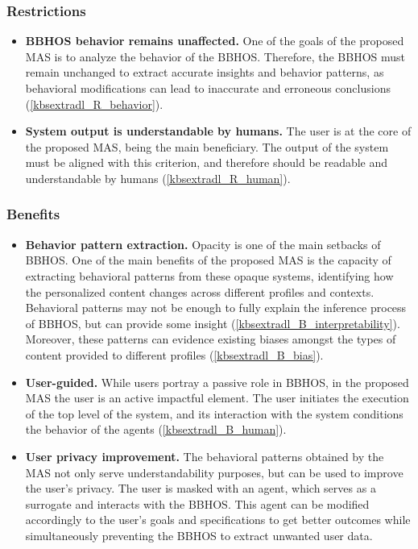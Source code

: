 \subsubsection*{Restrictions}
\begin{itemize}
    \item \textbf{BBHOS behavior remains unaffected.} One of the goals of the proposed MAS is to analyze the behavior of the BBHOS. Therefore, the BBHOS must remain unchanged to extract accurate insights and behavior patterns, as behavioral modifications can lead to inaccurate and erroneous conclusions (\ref{kbsextradl_R_behavior}).
    
    \item \textbf{System output is understandable by humans.} The user is at the core of the proposed MAS, being the main beneficiary. The output of the system must be aligned with this criterion, and therefore should be readable and understandable by humans (\ref{kbsextradl_R_human}).
\end{itemize}

\subsubsection*{Benefits}
\begin{itemize}
    \item \textbf{Behavior pattern extraction.} Opacity is one of the main setbacks of BBHOS. One of the main benefits of the proposed MAS is the capacity of extracting behavioral patterns from these opaque systems, identifying how the personalized content changes across different profiles and contexts. Behavioral patterns may not be enough to fully explain the inference process of BBHOS, but can provide some insight (\ref{kbsextradl_B_interpretability}). Moreover, these patterns can evidence existing biases amongst the types of content provided to different profiles (\ref{kbsextradl_B_bias}).
    
    \item \textbf{User-guided.} While users portray a passive role in BBHOS, in the proposed MAS the user is an active impactful element. The user initiates the execution of the top level of the system, and its interaction with the system conditions the behavior of the agents (\ref{kbsextradl_B_human}). 
    
    \item \textbf{User privacy improvement.} The behavioral patterns obtained by the MAS not only serve understandability purposes, but can be used to improve the user's privacy. The user is masked with an agent, which serves as a surrogate and interacts with the BBHOS. This agent can be modified accordingly to the user's goals and specifications to get better outcomes while simultaneously preventing the BBHOS to extract unwanted user data. 
\end{itemize}
